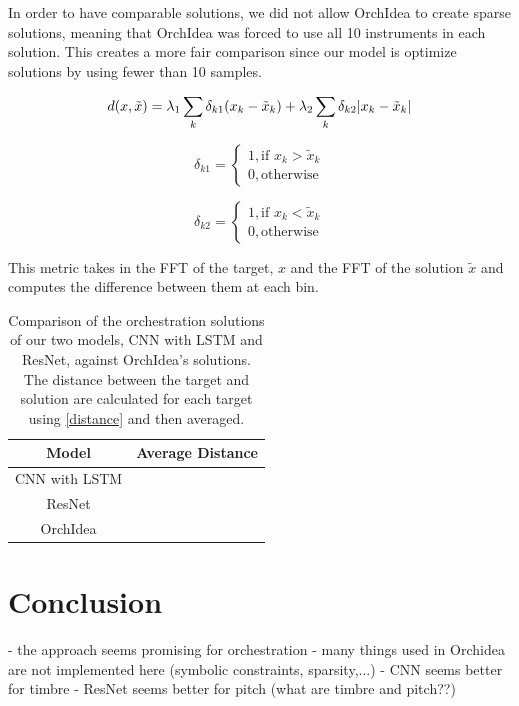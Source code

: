 \documentclass{article}
\begin{document}
In order to have comparable solutions, we did not allow OrchIdea to create sparse solutions, meaning that OrchIdea was forced to use all 10 instruments in each solution. This creates a more fair comparison since our model is optimize solutions by using fewer than 10 samples.

\begin{equation}\label{distance}
d(x, \tilde{x}) =\lambda_1 \sum_k \delta_{k1}(x_k - \tilde{x}_k) + \lambda_2 \sum_k \delta_{k2}|x_k - \tilde{x	}_k| \\
\end{equation}

\begin{equation}
\delta_{k1} = 
\begin{cases}
1, \text{if   } x_k > \tilde{x}_k \\
0, \text{otherwise}
\end{cases} 
\end{equation}

\begin{equation}
\delta_{k2} = 
\begin{cases}
1, \text{if   } x_k < \tilde{x}_k \\
0, \text{otherwise}
\end{cases}
\end{equation}

This metric takes in the FFT of the target, $x$ and the FFT of the solution $\tilde{x}$ and computes the difference between them at each bin.

\begin{table}
  \begin{center}
    \label{orch_eval}
    \begin{tabular}{|c|c|} 
    	  \hline
      \textbf{Model} & \textbf{Average Distance} \\
      \hline
      CNN with LSTM &   \\
      \hline
      ResNet &  \\
      \hline
      OrchIdea &  \\
      \hline
    \end{tabular}
  \end{center}
  \caption{Comparison of the orchestration solutions of our two models, CNN with LSTM and ResNet, against OrchIdea's solutions. The distance between the target and solution are calculated for each target using \eqref{distance} and then averaged.}
\end{table}

\section{Conclusion}
- the approach seems promising for orchestration
- many things used in Orchidea are not implemented here (symbolic constraints, sparsity,...)
- CNN seems better for timbre
- ResNet seems better for pitch (what are timbre and pitch??)
\end{document}
